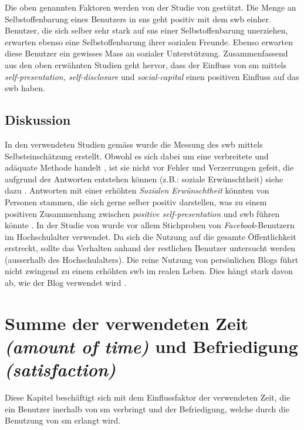 Die oben genannten Faktoren werden von der Studie von  gestützt. Die Menge an Selbstoffenbarung eines Benutzers in \gls{sns} geht positiv mit dem \gls{swb} einher. Benutzer, die sich selber sehr stark auf \gls{sns} einer Selbstoffenbarung unerziehen, erwarten ebenso eine Selbstoffenbarung ihrer sozialen Freunde. Ebenso erwarten diese Benutzer ein gewisses Mass an sozialer Unterstützung.\newline
Zusammenfassend aus den oben erwähnten Studien geht hervor, dass der Einfluss von \gls{sm} mittels \textit{self-presentation, self-disclosure} und \textit{social-capital} einen positiven Einfluss auf das \gls{swb} haben.

\subsection{Diskussion}\label{subsec.selfpDiskussion}
In den verwendeten Studien gemäss  wurde die Messung des \gls{swb} mittels Selbsteinschätzung erstellt. Obwohl es sich dabei um eine verbreitete und adäquate Methode handelt \cite{Diener:2005}, ist sie nicht vor Fehler und Verzerrungen gefeit, die aufgrund der Antworten entstehen können (z.B.: soziale Erwünschtheit) siehe dazu . Antworten mit einer erhöhten \textit{Sozialen Erwünschtheit} könnten von Personen stammen, die sich gerne selber positiv darstellen, was zu einem positiven Zusammenhang zwischen \textit{positive self-presentation} und \gls{swb} führen könnte \cite{Diener:1991}.\newline
In der Studie von  wurde vor allem Stichproben von \textit{Facebook}-Benutzern im Hochschulalter verwendet. Da sich die Nutzung auf die gesamte Öffentlichkeit erstreckt, sollte das Verhalten anhand der restlichen Benutzer untersucht werden (ausserhalb des Hochschulalters).\newline
Die reine Nutzung von persönlichen Blogs führt nicht zwingend zu einem erhöhten \gls{swb} im realen Leben. Dies hängt stark davon ab, wie der Blog verwendet wird \cite{Jung:2012}.

\section{Summe der verwendeten Zeit \textit{(amount of time)} und Befriedigung \textit{(satisfaction)}}\label{sub.amount}
Diese Kapitel beschäftigt sich mit dem Einflussfaktor der verwendeten Zeit, die ein Benutzer inerhalb von \gls{sm} verbringt und der Befriedigung, welche durch die Benutzung von \gls{sm} erlangt wird. 

